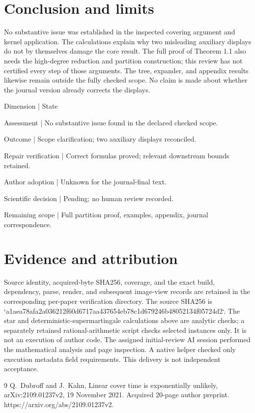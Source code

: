\documentclass[10pt]{article}
\begin{document}
\section*{Conclusion and limits}
No substantive issue was established in the inspected covering argument and kernel application. The calculations explain why two misleading auxiliary displays do not by themselves damage the core result. The full proof of Theorem 1.1 also needs the high-degree reduction and partition construction; this review has not certified every step of those arguments. The tree, expander, and appendix results likewise remain outside the fully checked scope. No claim is made about whether the journal version already corrects the displays.\par
Dimension | State\par
Assessment | No substantive issue found in the declared checked scope.\par
Outcome | Scope clarification; two auxiliary displays reconciled.\par
Repair verification | Correct formulas proved; relevant downstream bounds retained.\par
Author adoption | Unknown for the journal-final text.\par
Scientific decision | Pending; no human review recorded.\par
Remaining scope | Full partition proof, examples, appendix, journal correspondence.\par
\section*{Evidence and attribution}
Source identity, acquired-byte SHA256, coverage, and the exact build, dependency, parse, render, and subsequent image-view records are retained in the corresponding per-paper verification directory. The source SHA256 is `a1aea78afa2a036212f60d6717aa437654eb78c1d679246b48052134f05724d2`. The star and deterministic-supermartingale calculations above are analytic checks; a separately retained rational-arithmetic script checks selected instances only. It is not an execution of author code. The assigned initial-review AI session performed the mathematical analysis and page inspection. A native helper checked only execution metadata field requirements. This delivery is not independent acceptance.\par
9 Q. Dubroff and J. Kahn, Linear cover time is exponentially unlikely, arXiv:2109.01237v2, 19 November 2021. Acquired 20-page author preprint. https://arxiv.org/abs/2109.01237v2.\par
\end{document}
